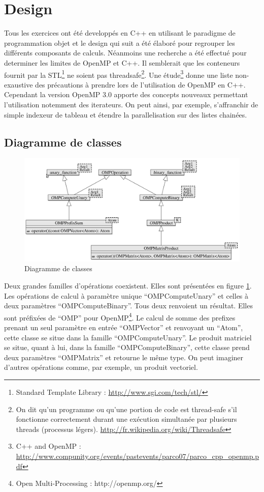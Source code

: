 \section{Design}

Tous les exercices ont été developpés en C++ en utilisant le paradigme de programmation objet et le design qui suit a été élaboré pour regrouper les différents composants de calculs. Néanmoins une recherche a été effectué pour determiner les limites de OpenMP et C++. Il semblerait que les conteneurs fournit par la STL\footnote{Standard Template Library : \url{http://www.sgi.com/tech/stl/}} ne soient pas threadsafe\footnote{On dit qu’un programme ou qu'une portion de code est thread-safe s'il fonctionne correctement durant une exécution simultanée par plusieurs threads (processus légers). \url{http://fr.wikipedia.org/wiki/Threadsafe}}. Une étude\footnote{C++ and OpenMP : \url{http://www.compunity.org/events/pastevents/parco07/parco_cpp_openmp.pdf}} donne une liste non-exaustive des précautions à prendre lors de l’utilisation de OpenMP en C++. Cependant la version OpenMP 3.0 apporte des concepts nouveaux permettant l’utilisation notemment des iterateurs. On peut ainsi, par exemple, s’affranchir de simple indexeur de tableau et étendre la parallelisation sur des listes chainées.

\subsection{Diagramme de classes}

\begin{figure}[here]
\centering
\includegraphics[scale=0.45]{images/diagram}
\caption{Diagramme de classes}
\label{fig:diagram}
\end{figure}

Deux grandes familles d'opérations coexistent. Elles sont présentées en figure \ref{fig:diagram}. Les opérations de calcul à paramètre unique ``OMPComputeUnary'' et celles à deux paramètres ``OMPComputeBinary''. Tous deux renvoient un résultat. Elles sont préfixées de ``OMP'' pour OpenMP\footnote{Open Multi-Processing : http://openmp.org/}. Le calcul de somme des prefixes prenant un seul paramètre en entrée ``OMPVector'' et renvoyant un ``Atom'', cette classe se situe dans la famille ``OMPComputeUnary''. Le produit matriciel se situe, quant à lui, dans la famille “OMPComputeBinary”, cette classe prend deux paramètres ``OMPMatrix'' et retourne le même type. On peut imaginer d'autres opérations comme, par exemple, un produit vectoriel.

